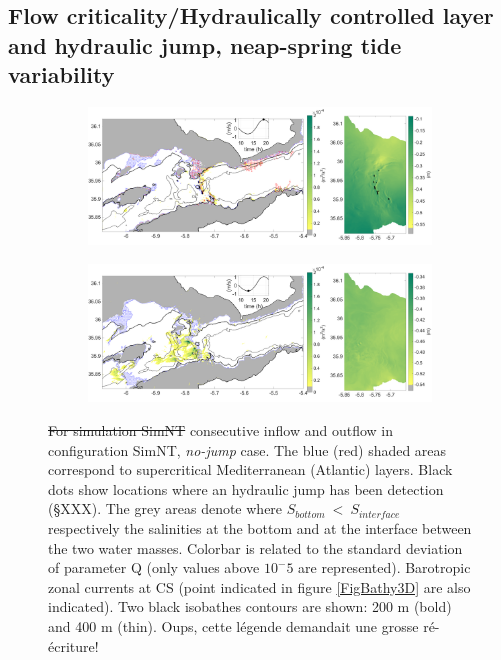 \subsection{Flow criticality/Hydraulically controlled layer and hydraulic jump, neap-spring tide variability}


\begin{figure}[!h]
 \centering
 
 \begin{subfigure}{\linewidth}
\centering
\includegraphics[width=1\linewidth]{./GBR3D/ME2_19h_p.png}
\end{subfigure}
 
 \begin{subfigure}{\linewidth}
\centering
\includegraphics[width=\linewidth]{./GBR3D/ME2_13h_p.png}
\end{subfigure}
\caption { \color{blue} \sout{For simulation SimNT} consecutive inflow and outflow in configuration SimNT, \textit{no-jump} case. The blue (red) shaded areas correspond to supercritical Mediterranean (Atlantic) layers. Black dots show locations where an hydraulic jump has been detection (\S XXX). The grey areas denote where $S_{bottom}\ <\ S_{interface}$ respectively the salinities at the bottom and at the interface between the two water masses. Colorbar is related to the standard deviation of parameter Q (only values above $10^-5$ are represented). Barotropic zonal currents at CS (point indicated in figure \ref{FigBathy3D} are also indicated). Two black isobathes contours are shown: 200 m (bold) and 400 m (thin). \color{green} Oups, cette légende demandait une grosse ré-écriture! \color{black}}

\label{FigHCN}
\end{figure}

